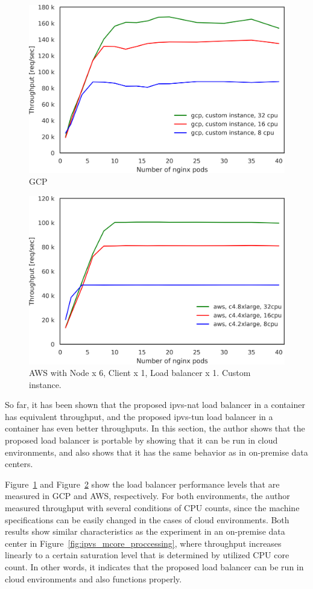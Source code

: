 \begin{figure}[t]
  \centering
  \includegraphics[width=0.8\columnwidth]{Figs/gcp_all_tp}
  \caption{GCP}
  \label{fig:gcp_all_ieice}
\end{figure}

\begin{figure}[t]
  \centering
  \includegraphics[width=0.8\columnwidth]{Figs/aws_c4_tp}
  \caption{AWS with Node x 6, Client x 1, Load balancer x 1. Custom instance. }
  \label{fig:aws_c4_ieice}
\end{figure}

So far, it has been shown that the proposed ipvs-nat load balancer in a container has equivalent throughput, and the proposed ipvs-tun load balancer in a container has even better throughputs.
In this section, the author shows that the proposed load balancer is portable by showing that it can be run in cloud environments, and also shows that it has the same behavior as in on-premise data centers.

Figure~\ref{fig:gcp_all_ieice} and Figure~\ref{fig:aws_c4_ieice} show the load balancer performance levels that are measured in GCP and AWS, respectively.
For both environments, the author measured throughput with several conditions of CPU counts, since the machine specifications can be easily changed in the cases of cloud environments.
Both results show similar characteristics as the experiment in an on-premise data center in Figure~\ref{fig:ipvs_mcore_proccessing}, where throughput increases linearly to a certain saturation level that is determined by utilized CPU core count.
In other words, it indicates that the proposed load balancer can be run in cloud environments and also functions properly.

